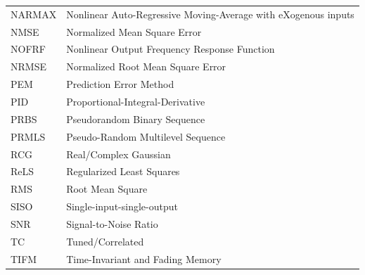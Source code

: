 \documentclass[11pt,twoside]{report}
\begin{document}
\begin{longtable}{p{} p{}}
NARMAX & Nonlinear Auto-Regressive Moving-Average with eXogenous inputs \\
NMSE & Normalized Mean Square Error \\
NOFRF & Nonlinear Output Frequency Response Function \\
NRMSE & Normalized Root Mean Square Error \\
PEM & Prediction Error Method \\
PID & Proportional-Integral-Derivative \\
PRBS & Pseudorandom Binary Sequence \\
PRMLS & Pseudo-Random Multilevel Sequence \\
RCG & Real/Complex Gaussian \\
ReLS & Regularized Least Squares \\
RMS & Root Mean Square \\
SISO & Single-input-single-output \\
SNR & Signal-to-Noise Ratio \\
TC & Tuned/Correlated \\
TIFM & Time-Invariant and Fading Memory 
\end{longtable}
\thispagestyle{plain}
\end{document}
